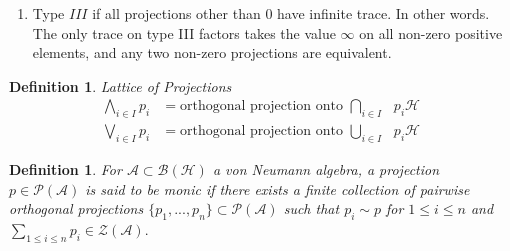 \documentclass[aps,preprint]{revtex4}%
\newtheorem{definition}[theorem]{Definition}
\begin{document}
\begin{enumerate}
\begin{enumerate}
\item The Clifford algebra of $2^{n}\times2^{n}$ matrices is just another name
for the algebra generated by creation and annihilation operators on the
fermionic Fock space over $\mathbb{C}^{n}$. One can show that the hyperfinite
$II_{1}$ factor is the smallest von Neumann algebra containing the creation
and annihilation operators on a fermionic Fock space of countably infinite dimension.

\item There is more than one Type $II_{\infty}$ factor, but again there is
only one that is hyperfinite. You can get this by tensoring the Type
$I_{\infty}$ and the hyperfinite $II_{1}$.
\end{enumerate}

\item Type $III$ if all projections other than $0$ have infinite trace. In
other words. The only trace on type III factors takes the value $\infty$ on
all non-zero positive elements, and any two non-zero projections are equivalent.
\end{enumerate}

\begin{definition}
Lattice of Projections%
\begin{align}%
{\textstyle\bigwedge\limits_{i\in I}}
p_{i}  &  =\text{orthogonal projection onto }%
{\textstyle\bigcap\limits_{i\in I}}
\text{ }p_{i}\mathcal{H}\\%
{\textstyle\bigvee\limits_{i\in I}}
p_{i}  &  =\text{orthogonal projection onto }%
{\textstyle\bigcup\limits_{i\in I}}
\text{ }p_{i}\mathcal{H}%
\end{align}

\end{definition}

\begin{definition}
For $\mathcal{A}\subset\mathcal{B(H)}$ a von Neumann algebra, a projection
$p\in\mathcal{P(A)}$ is said to be monic if there exists a finite collection
of pairwise orthogonal projections $\{p_{1},...,p_{n}\}\subset\mathcal{P(A)}$
such that $p_{i}\sim p$ for $1\leq i\leq n$ and $%
{\textstyle\sum\limits_{1\leq i\leq n}}
p_{i}\in\mathcal{Z}\left(  \mathcal{A}\right)  .$
\end{definition}
\end{document}
